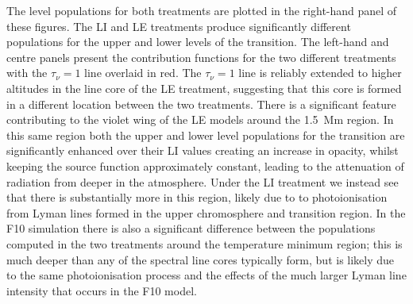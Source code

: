 The level populations for both treatments are plotted in the right-hand panel of these figures.
The LI and LE treatments produce significantly different populations for the upper and lower levels of the \CaLine{} transition.
The left-hand and centre panels present the contribution functions for the two different treatments with the $\tau_\nu=1$ line overlaid in red.
The $\tau_\nu=1$ line is reliably extended to higher altitudes in the line core of the LE treatment, suggesting that this core is formed in a different location between the two treatments.
There is a significant feature contributing to the violet wing of the LE models around the \SI{1.5}{\mega\metre} region.
In this same region both the upper and lower level populations for the \CaLine{} transition are significantly enhanced over their LI values creating an increase in opacity, whilst keeping the source function approximately constant, leading to the attenuation of radiation from deeper in the atmosphere.
Under the LI treatment we instead see that there is substantially more \Caiii{} in this region, likely due to \Caii{} to \Caiii{} photoionisation from Lyman lines formed in the upper chromosphere and transition region.
In the F10 simulation there is also a significant difference between the \Caiii{} populations computed in the two treatments around the temperature minimum region; this is much deeper than any of the \Caii{} spectral line cores typically form, but is likely due to the same photoionisation process and the effects of the much larger Lyman line intensity that occurs in the F10 model.

